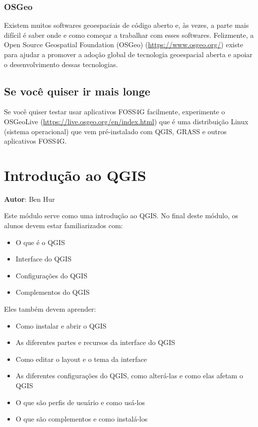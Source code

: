 \documentclass[
]{krantz}
\providecommand{\tightlist}{%
  \setlength{\itemsep}{0pt}\setlength{\parskip}{0pt}}
\begin{document}
\hypertarget{osgeo}{%
\subsection{OSGeo}\label{osgeo}}

Existem muitos softwares geoespaciais de código aberto e, às vezes, a parte mais difícil é saber onde e como começar a trabalhar com esses softwares. Felizmente, a Open Source Geospatial Foundation (OSGeo) (\url{https://www.osgeo.org/}) existe para ajudar a promover a adoção global de tecnologia geoespacial aberta e apoiar o desenvolvimento dessas tecnologias.

\hypertarget{se-vocuxea-quiser-ir-mais-longe}{%
\section{Se você quiser ir mais longe}\label{se-vocuxea-quiser-ir-mais-longe}}

Se você quiser testar usar aplicativos FOSS4G facilmente, experimente o OSGeoLive (\url{https://live.osgeo.org/en/index.html}) que é uma distribuição Linux (sistema operacional) que vem pré-instalado com QGIS, GRASS e outros aplicativos FOSS4G.

\hypertarget{introduuxe7uxe3o-ao-qgis}{%
\chapter{Introdução ao QGIS}\label{introduuxe7uxe3o-ao-qgis}}

\textbf{Autor}: Ben Hur

Este módulo serve como uma introdução ao QGIS. No final deste módulo, os alunos devem estar familiarizados com:

\begin{itemize}
\tightlist
\item
  O que é o QGIS
\item
  Interface do QGIS
\item
  Configurações do QGIS
\item
  Complementos do QGIS
\end{itemize}

Eles também devem aprender:

\begin{itemize}
\tightlist
\item
  Como instalar e abrir o QGIS
\item
  As diferentes partes e recursos da interface do QGIS
\item
  Como editar o layout e o tema da interface
\item
  As diferentes configurações do QGIS, como alterá-las e como elas afetam o QGIS
\item
  O que são perfis de usuário e como usá-los
\item
  O que são complementos e como instalá-los
\end{itemize}
\end{document}
